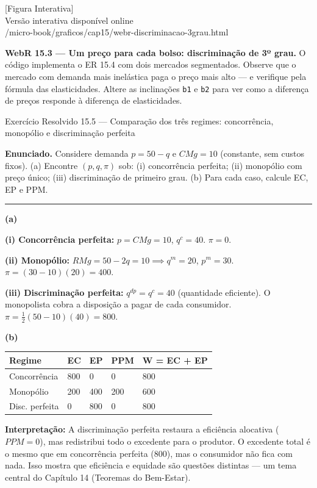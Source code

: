 \documentclass[11pt,twoside,openright]{book}
\newcommand{\figurePlaceholder}[1]{%
  \begin{center}
    \begin{tcolorbox}[
      width=0.85\textwidth,
      colback=graybg,
      colframe=gray,
      boxrule=0.5pt,
      arc=2pt,
      halign=center,
      valign=center,
      height=5cm
    ]
      \centering
      \vfill
      {\sffamily\color{gray}\large [Figura Interativa]}\\[6pt]
      {\sffamily\small\color{gray} Versão interativa disponível online}\\[4pt]
      {\ttfamily\tiny\color{gray} #1}
      \vfill
    \end{tcolorbox}
  \end{center}
}
\begin{document}
\figurePlaceholder{/micro-book/graficos/cap15/webr-discriminacao-3grau.html}

\textbf{WebR 15.3 --- Um preço para cada bolso: discriminação de 3º
grau.} O código implementa o ER 15.4 com dois mercados segmentados.
Observe que o mercado com demanda mais inelástica paga o preço mais alto
--- e verifique pela fórmula das elasticidades. Altere as inclinações
\texttt{b1} e \texttt{b2} para ver como a diferença de preços responde à
diferença de elasticidades.

\begin{exresolvidobox}{Exercício Resolvido 15.5 — Comparação dos três regimes: concorrência, monopólio e discriminação perfeita}

\textbf{Enunciado.} Considere demanda \(p = 50 - q\) e \(CMg = 10\)
(constante, sem custos fixos). (a) Encontre \((p, q, \pi)\) sob: (i)
concorrência perfeita; (ii) monopólio com preço único; (iii)
discriminação de primeiro grau. (b) Para cada caso, calcule EC, EP e
PPM.

\begin{center}\rule{0.5\linewidth}{0.5pt}\end{center}

\textbf{(a)}

\textbf{(i) Concorrência perfeita:} \(p = CMg = 10\), \(q^c = 40\).
\(\pi = 0\).

\textbf{(ii) Monopólio:} \(RMg = 50 - 2q = 10 \implies q^m = 20\),
\(p^m = 30\). \(\pi = (30-10)(20) = 400\).

\textbf{(iii) Discriminação perfeita:} \(q^{dp} = q^c = 40\) (quantidade
eficiente). O monopolista cobra a disposição a pagar de cada consumidor.
\(\pi = \frac{1}{2}(50-10)(40) = 800\).

\textbf{(b)}

{\def\LTcaptype{none} %
\begin{longtable}[]{@{}lllll@{}}
\toprule\noalign{}
Regime & EC & EP & PPM & W = EC + EP \\
\midrule\noalign{}
\endhead
\bottomrule\noalign{}
\endlastfoot
Concorrência & 800 & 0 & 0 & 800 \\
Monopólio & 200 & 400 & 200 & 600 \\
Disc. perfeita & 0 & 800 & 0 & 800 \\
\end{longtable}
}

\textbf{Interpretação:} A discriminação perfeita restaura a eficiência
alocativa (\(PPM = 0\)), mas redistribui todo o excedente para o
produtor. O excedente total é o mesmo que em concorrência perfeita
(800), mas o consumidor não fica com nada. Isso mostra que eficiência e
equidade são questões distintas --- um tema central do Capítulo 14
(Teoremas do Bem-Estar).

\end{exresolvidobox}
\end{document}
